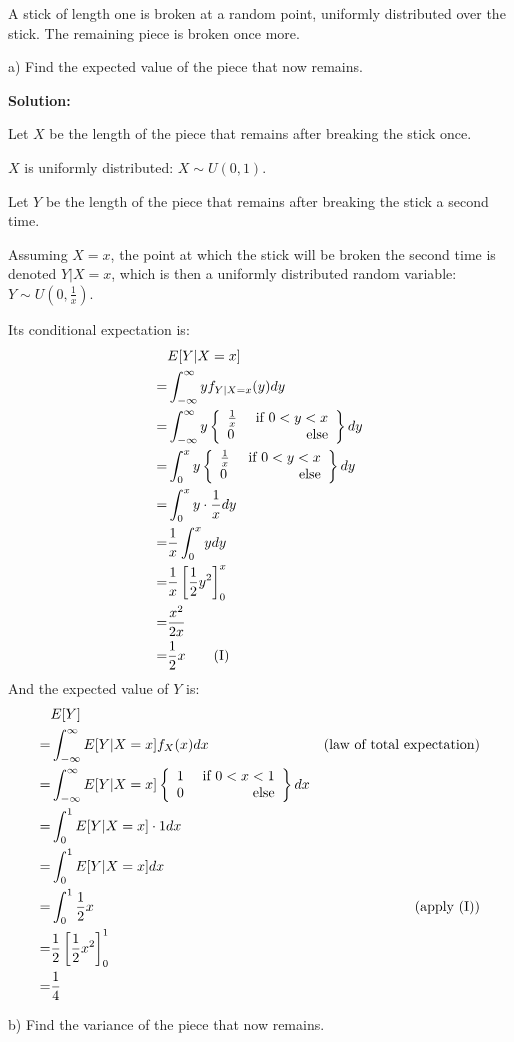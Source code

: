\documentclass{article}
\begin{document}
A stick of length one is broken at a random point, uniformly distributed over the stick. The remaining piece is broken once more.

a) Find the expected value of the piece that now remains.

\textbf{Solution:}

Let \(X\) be the length of the piece that remains after breaking the stick once.

\(X\) is uniformly distributed: \(X\sim U(0,1)\).

Let \(Y\) be the length of the piece that remains after breaking the stick a second time.

Assuming \(X=x\), the point at which the stick will be broken the second time is denoted \(Y|X=x\), which is then a uniformly distributed random variable: \(Y\sim U(0,\frac{1}{x})\).

Its conditional expectation is:
\begin{align*}
     & E[Y|X=x] \\
    =& \int_{-\infty}^{\infty} yf_{Y|X=x}(y)dy \\
    =& \int_{-\infty}^{\infty} y\left\{\begin{array}{lr}\frac{1}{x} & \text{ if }0<y<x\\0 & \text{ else}\end{array}\right\}dy \\
    =& \int_0^x y\left\{\begin{array}{lr}\frac{1}{x} & \text{ if }0<y<x\\0 & \text{ else}\end{array}\right\}dy \\
    =& \int_0^x y\cdot\frac{1}{x}dy \\
    =& \frac{1}{x}\int_0^x ydy \\
    =& \frac{1}{x}\left[\frac12y^2\right]_0^x \\
    =& \frac{x^2}{2x} \\
    =& \frac{1}{2}x \tag{I}
\end{align*}
And the expected value of \(Y\) is:
\begin{align*}
     & E[Y] \\
    =& \int_{-\infty}^{\infty} E[Y|X=x]f_X(x)dx & (\text{law of total expectation}) \\
    =& \int_{-\infty}^{\infty} E[Y|X=x]\left\{\begin{array}{lr}1 & \text{ if }0<x<1\\0 & \text{ else}\end{array}\right\}dx \\
    =& \int_0^1 E[Y|X=x] \cdot 1dx \\
    =& \int_0^1 E[Y|X=x]dx \\
    =& \int_0^1 \frac{1}{2}x & (\text{apply (I)}) \\
    =& \frac{1}{2}\left[\frac12x^2\right]_0^1 \\
    =& \frac{1}{4}
\end{align*}

b) Find the variance of the piece that now remains.
\end{document}
